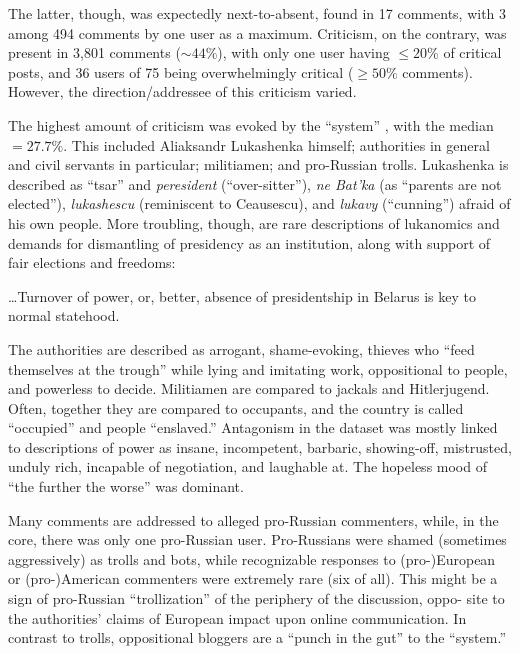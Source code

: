 The latter, though, was expectedly next-to-absent, found in 17 comments, with 3 among 494 comments by one user as a maximum. Criticism, on the contrary, was present in 3,801 comments (\(\sim 44\%\)), with only one user having \(\le 20\%\) of critical posts, and 36 users of 75 being overwhelmingly critical (\(\ge 50\%\) comments). However, the direction/addressee of this criticism varied.

The highest amount of criticism was evoked by the “system” \cite{Ledeneva}, with the median \(= 27.7\%\). This included Aliaksandr Lukashenka himself; authorities in general and civil servants in particular; militiamen; and pro-Russian trolls. Lukashenka is described as “tsar” and \textit{peresident} (“over-sitter”), \textit{ne Bat’ka} (as “parents are not elected”), \textit{lukashescu} (reminiscent to Ceausescu), and \textit{lukavy} (“cunning”) afraid of his own people. More troubling, though, are rare descriptions of lukanomics and demands for dismantling of presidency as an institution, along with support of fair elections and freedoms:

\begin{displayquote}
	…Turnover of power, or, better, absence of presidentship in Belarus is key to normal statehood.
\end{displayquote}

The authorities are described as arrogant, shame-evoking, thieves who “feed themselves at the trough” while lying and imitating work, oppositional to people, and powerless to decide. Militiamen are compared to jackals and Hitlerjugend. Often, together they are compared to occupants, and the country is called “occupied” and people “enslaved.” Antagonism in the dataset was mostly linked to descriptions of power as insane, incompetent, barbaric, showing-off, mistrusted, unduly rich, incapable of negotiation, and laughable at. The hopeless mood of “the further the worse” was dominant.

Many comments are addressed to alleged pro-Russian commenters, while, in the core, there was only one pro-Russian user. Pro-Russians were shamed (sometimes aggressively) as trolls and bots, while recognizable responses to (pro-)European or (pro-)American commenters were extremely rare (six of all). This might be a sign of pro-Russian “trollization” of the periphery of the discussion, oppo- site to the authorities’ claims of European impact upon online communication. In contrast to trolls, oppositional bloggers are a “punch in the gut” to the “system.”

